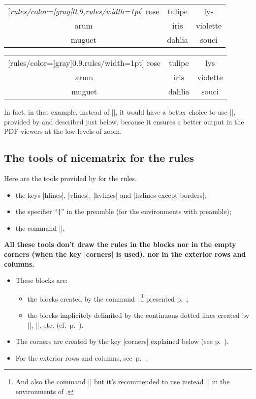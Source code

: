 \documentclass[dvipsnames]{article}%
\begin{document}
\medskip
\begin{Code}[width=15cm]
\begin{NiceTabular}{|ccc|}[\emph{rules/color=[gray]{0.9},rules/width=1pt}]
\hline
rose & tulipe & lys \\
arum & iris & violette \\
muguet & dahlia & souci \\
\hline
\end{NiceTabular}
\end{Code}
\hspace{-5cm}
\begin{NiceTabular}{|ccc|}[rules/color=[gray]{0.9},rules/width=1pt]
\hline
rose & tulipe & lys \\
arum & iris & violette \\
muguet & dahlia & souci \\
\hline
\end{NiceTabular}


\medskip
In fact, in that example, instead of |\hline|, it would have a better choice to
use |\Hline|, provided by  and described just below, because it
ensures a better output in the PDF viewers at the low levels of zoom.

\subsection{The tools of nicematrix for the rules}

Here are the tools provided by  for the rules.
\begin{itemize}
\item the keys |hlines|, |vlines|, |hvlines| and |hvlines-except-borders|;
\item the specifier ``\verb+|+'' in the preamble (for the environments with
preamble);
\item {}
the command |\Hline|.
\end{itemize}

\medskip
\textbf{All these tools don't draw the rules in the blocks nor in the
empty corners (when the key |corners| is used), nor in the exterior rows and
columns.}
\begin{itemize} 
\item These blocks are:
\begin{itemize}
\item the blocks created by the command |\Block|\footnote{And also the command |\multicolumn| but
it's recommended to use instead |\Block| in the environments of
.} presented
p.~\pageref{Block};
\item the blocks implicitely delimited by the continuous dotted lines created
by |\Cdots|, |\Vdots|, etc. (cf.~p.~\pageref{Cdots}).
\end{itemize}
\item The corners are created by the key |corners| explained below (see
p.~\pageref{corners}).
\item For the exterior rows and columns, see~p.~\pageref{exterior}.
\end{itemize}
\end{document}
